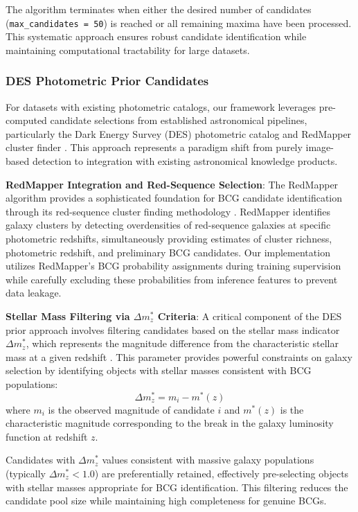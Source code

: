\documentclass[twocolumn,10pt]{aastex631}
\begin{document}
The algorithm terminates when either the desired number of candidates (\texttt{max\_candidates = 50}) is reached or all remaining maxima have been processed. This systematic approach ensures robust candidate identification while maintaining computational tractability for large datasets.

\subsubsection{DES Photometric Prior Candidates}

For datasets with existing photometric catalogs, our framework leverages pre-computed candidate selections from established astronomical pipelines, particularly the Dark Energy Survey (DES) photometric catalog and RedMapper cluster finder \citep{Rykoff2014redMaPPer,Rykoff2016}. This approach represents a paradigm shift from purely image-based detection to integration with existing astronomical knowledge products.

\textbf{RedMapper Integration and Red-Sequence Selection}: The RedMapper algorithm provides a sophisticated foundation for BCG candidate identification through its red-sequence cluster finding methodology \citep{Rykoff2014redMaPPer}. RedMapper identifies galaxy clusters by detecting overdensities of red-sequence galaxies at specific photometric redshifts, simultaneously providing estimates of cluster richness, photometric redshift, and preliminary BCG candidates. Our implementation utilizes RedMapper's BCG probability assignments during training supervision while carefully excluding these probabilities from inference features to prevent data leakage.

\textbf{Stellar Mass Filtering via $\Delta m^*_z$ Criteria}: A critical component of the DES prior approach involves filtering candidates based on the stellar mass indicator $\Delta m^*_z$, which represents the magnitude difference from the characteristic stellar mass at a given redshift \citep{Rykoff2016}. This parameter provides powerful constraints on galaxy selection by identifying objects with stellar masses consistent with BCG populations:
\begin{equation}
\Delta m^*_z = m_i - m^*(z)
\end{equation}
where $m_i$ is the observed magnitude of candidate $i$ and $m^*(z)$ is the characteristic magnitude corresponding to the break in the galaxy luminosity function at redshift $z$.

Candidates with $\Delta m^*_z$ values consistent with massive galaxy populations (typically $\Delta m^*_z < 1.0$) are preferentially retained, effectively pre-selecting objects with stellar masses appropriate for BCG identification. This filtering reduces the candidate pool size while maintaining high completeness for genuine BCGs.
\end{document}
